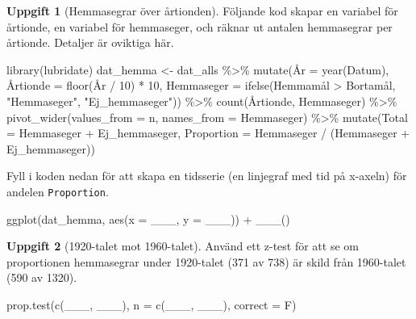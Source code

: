 \documentclass[
]{book}
\newenvironment{Shaded}{\begin{snugshade}}{\end{snugshade}}
\newcommand{\AttributeTok}[1]{\textcolor[rgb]{0.77,0.63,0.00}{#1}}
\newcommand{\DecValTok}[1]{\textcolor[rgb]{0.00,0.00,0.81}{#1}}
\newcommand{\FunctionTok}[1]{\textcolor[rgb]{0.00,0.00,0.00}{#1}}
\newcommand{\NormalTok}[1]{#1}
\newcommand{\OtherTok}[1]{\textcolor[rgb]{0.56,0.35,0.01}{#1}}
\newcommand{\SpecialCharTok}[1]{\textcolor[rgb]{0.00,0.00,0.00}{#1}}
\newcommand{\StringTok}[1]{\textcolor[rgb]{0.31,0.60,0.02}{#1}}
\theoremstyle{definition}
\theoremstyle{definition}
\theoremstyle{definition}
\newtheorem{exercise}{Uppgift}[chapter]
\theoremstyle{definition}
\theoremstyle{remark}
\begin{document}
\begin{exercise}[Hemmasegrar över årtionden]
Följande kod skapar en variabel för årtionde, en variabel för hemmaseger, och räknar ut antalen hemmasegrar per årtionde. Detaljer är oviktiga här.

\begin{Shaded}
\begin{Highlighting}[]
\FunctionTok{library}\NormalTok{(lubridate)}
\NormalTok{dat\_hemma }\OtherTok{\textless{}{-}}\NormalTok{ dat\_alls }\SpecialCharTok{\%\textgreater{}\%} 
  \FunctionTok{mutate}\NormalTok{(Å}\AttributeTok{r =} \FunctionTok{year}\NormalTok{(Datum),}
\NormalTok{         Å}\AttributeTok{rtionde =} \FunctionTok{floor}\NormalTok{(År }\SpecialCharTok{/} \DecValTok{10}\NormalTok{) }\SpecialCharTok{*} \DecValTok{10}\NormalTok{,}
         \AttributeTok{Hemmaseger =} \FunctionTok{ifelse}\NormalTok{(Hemmamål }\SpecialCharTok{\textgreater{}}\NormalTok{ Bortamål, }\StringTok{"Hemmaseger"}\NormalTok{, }\StringTok{"Ej\_hemmaseger"}\NormalTok{)) }\SpecialCharTok{\%\textgreater{}\%} 
  \FunctionTok{count}\NormalTok{(Årtionde, Hemmaseger) }\SpecialCharTok{\%\textgreater{}\%} 
  \FunctionTok{pivot\_wider}\NormalTok{(}\AttributeTok{values\_from =}\NormalTok{ n, }\AttributeTok{names\_from =}\NormalTok{ Hemmaseger) }\SpecialCharTok{\%\textgreater{}\%} 
  \FunctionTok{mutate}\NormalTok{(}\AttributeTok{Total =}\NormalTok{ Hemmaseger }\SpecialCharTok{+}\NormalTok{ Ej\_hemmaseger,}
         \AttributeTok{Proportion =}\NormalTok{ Hemmaseger }\SpecialCharTok{/}\NormalTok{ (Hemmaseger }\SpecialCharTok{+}\NormalTok{ Ej\_hemmaseger))}
\end{Highlighting}
\end{Shaded}

Fyll i koden nedan för att skapa en tidsserie (en linjegraf med tid på x-axeln) för andelen \texttt{Proportion}.

\begin{Shaded}
\begin{Highlighting}[]
\FunctionTok{ggplot}\NormalTok{(dat\_hemma, }\FunctionTok{aes}\NormalTok{(}\AttributeTok{x =}\NormalTok{ \_\_\_, }\AttributeTok{y =}\NormalTok{ \_\_\_)) }\SpecialCharTok{+}
  \FunctionTok{\_\_\_}\NormalTok{()}
\end{Highlighting}
\end{Shaded}

\end{exercise}

\begin{exercise}[1920-talet mot 1960-talet]

Använd ett z-test för att se om proportionen hemmasegrar under 1920-talet (371 av 738) är skild från 1960-talet (590 av 1320).

\begin{Shaded}
\begin{Highlighting}[]
\FunctionTok{prop.test}\NormalTok{(}\FunctionTok{c}\NormalTok{(\_\_\_, \_\_\_), }\AttributeTok{n =} \FunctionTok{c}\NormalTok{(\_\_\_, \_\_\_), }\AttributeTok{correct =}\NormalTok{ F)}
\end{Highlighting}
\end{Shaded}

\end{exercise}
\end{document}
